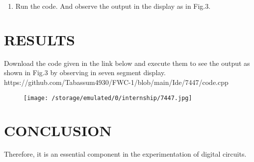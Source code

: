 \documentclass[conference]{IEEEtran}
\begin{document}
\begin {enumerate}
\begin{table} [htbp]
\centering
\begin{tabular}{| c | c | c | c | c | c | c |c |} \hline
$Z$ & $Y$ & $X$ & $W$ & $D$ & $C$ & $B$ & $A$ \\\hline
$0$ & $0$ & $0$ & $0$ & $0$ & $0$ & $0$ & $1$ \\ \hline 
$0$ & $0$ & $0$ & $1$ & $0$ & $0$ & $1$ & $0$ \\ \hline
$0$ & $0$ & $1$ & $0$ & $0$ & $0$ & $1$ & $1$ \\ \hline
$0$ & $0$ & $1$ & $1$ & $0$ & $1$ & $0$ & $0$ \\ \hline
$0$ & $1$ & $0$ & $0$ & $0$ & $1$ & $0$ & $1$ \\ \hline
$0$ & $1$ & $0$ & $1$ & $0$ & $1$ & $1$ & $0$ \\ \hline
$0$ & $1$ & $1$ & $0$ & $0$ & $1$ & $1$ & $1$ \\ \hline
$0$ & $1$ & $1$ & $1$ & $1$ & $0$ & $0$ & $0$ \\ \hline
$1$ & $0$ & $0$ & $0$ & $1$ & $0$ & $0$ & $1$ \\ \hline
$1$ & $0$ & $0$ & $1$ & $0$ & $0$ & $0$ & $0$ \\ \hline
\end{tabular}
\vspace{0.1cm}
\caption{\label{tab:widgets}}
\end{table}

\item Run the code. And observe the output in the display as in Fig.3.

\end {enumerate}                     
\section{RESULTS}
Download the code given in the link below and execute them to see the output as shown in Fig.3 by observing in seven segment display. 
\\ https://github.com/Tabassum4930/FWC-1/blob/main/Ide/7447/code.cpp
\begin{figure}[h] 
	\centering 
	\texttt{[image: /storage/emulated/0/internship/7447.jpg]}
	\caption{\label{fig:Gates}}    
\end{figure}
\section{CONCLUSION}
Therefore, it is an essential component in the experimentation of digital circuits.
\end{document}
